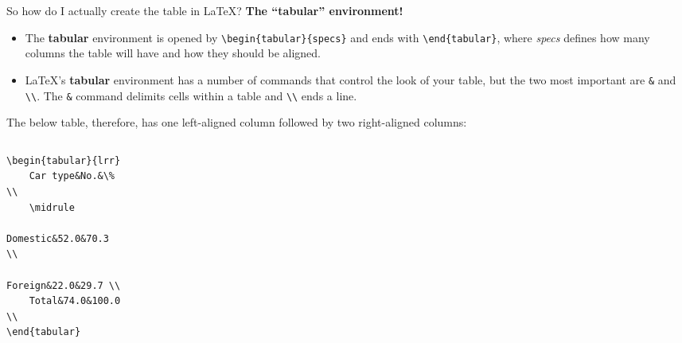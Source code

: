 \documentclass[fleqn, table, 10pt]{beamer}
\def\results{S:/trainings/exporting_stata_tables_figures/results}
\begin{document}
\begin{frame}[fragile]{So how do I actually create the table in \LaTeX{}?}
    \textbf{The ``tabular'' environment!} \\
    \begin{itemize}
        \item The \textbf{tabular} environment is opened by \verb+\begin{tabular}{specs}+ and ends with \verb+\end{tabular}+, where \emph{specs} defines how many columns the table will have and how they should be aligned.
        \item \LaTeX{}'s \textbf{tabular} environment has a number of commands that control the look of your table, but the two most important are \verb+&+ and \verb+\\+. The \verb+&+ command  delimits cells within a table and \verb+\\+ ends a line.
    \end{itemize}
    The below table, therefore, has one left-aligned column followed by two right-aligned columns: \\
    \vspace{.5cm}
    \pause
    \begin{columns}[t]
            \vspace{-1.5cm}
            {\footnotesize
            \begin{verbatim}
\begin{tabular}{lrr}
    Car type&No.&\% \\
    \midrule
    Domestic&52.0&70.3 \\
    Foreign&22.0&29.7 \\
    Total&74.0&100.0 \\
\end{tabular}
            \end{verbatim}
            }
            \begin{tabular}{lrr}
                 
            \end{tabular}
    \end{columns}
\end{frame}
\end{document}
